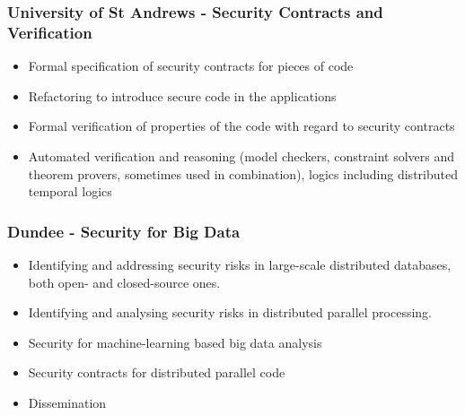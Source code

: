 \documentclass[a4paper,11pt]{article}
\begin{document}
\subsubsection{University of St Andrews - Security Contracts and Verification}
\begin{itemize}
    \item Formal specification of security contracts for pieces of code
    \item Refactoring to introduce secure code in the applications
    \item Formal verification of properties of the code with regard to security contracts
    \item Automated verification and reasoning (model checkers, constraint solvers and theorem provers, sometimes used in combination), logics including distributed temporal logics 
\end{itemize}

\subsubsection{Dundee - Security for Big Data}
\begin{itemize}
    \item Identifying and addressing security risks in large-scale distributed databases, both open- and closed-source ones.
    \item Identifying and analysing security risks in distributed parallel processing.
    \item Security for machine-learning based big data analysis
    \item Security contracts for distributed parallel code
    \item Dissemination
\end{itemize}
\end{document}
